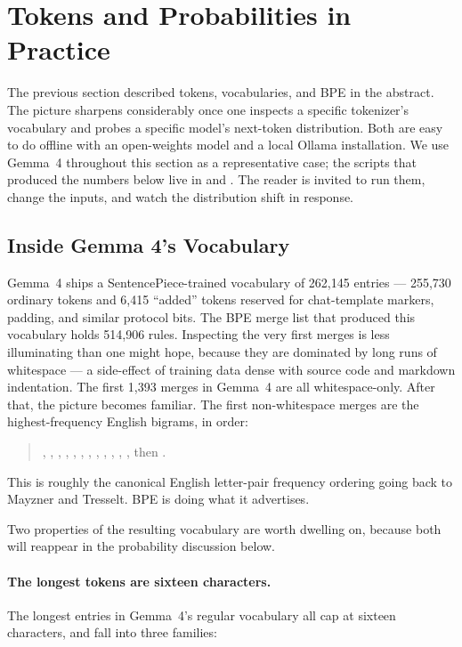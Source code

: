 \section{Tokens and Probabilities in Practice}
\label{sec:mental-tokens-practice}

The previous section described tokens, vocabularies, and BPE in the
abstract. The picture sharpens considerably once one inspects a
specific tokenizer's vocabulary and probes a specific model's
next-token distribution. Both are easy to do offline with an
open-weights model and a local Ollama installation. We use Gemma~4
throughout this section as a representative case; the scripts that
produced the numbers below live in
 and
. The reader is
invited to run them, change the inputs, and watch the distribution
shift in response.

\subsection{Inside Gemma 4's Vocabulary}
\label{sec:mental-tokens-vocab}

Gemma~4 ships a SentencePiece-trained vocabulary of 262{,}145
entries --- 255{,}730 ordinary tokens and 6{,}415 ``added''
tokens reserved for chat-template markers, padding, and similar
protocol bits. The BPE merge list that produced this vocabulary
holds 514{,}906 rules. Inspecting the very first merges is less
illuminating than one might hope, because they are dominated by
long runs of whitespace --- a side-effect of training data dense
with source code and markdown indentation. The first 1{,}393
merges in Gemma~4 are all whitespace-only. After that, the picture
becomes familiar. The first non-whitespace merges are the
highest-frequency English bigrams, in order:
\begin{quote}
  , , , , ,
  , , , , ,
  , , then .
\end{quote}

\noindent
This is roughly the canonical English letter-pair frequency
ordering going back to Mayzner and Tresselt. BPE is doing what
it advertises.

Two properties of the resulting vocabulary are worth dwelling
on, because both will reappear in the probability discussion
below.

\paragraph{The longest tokens are sixteen characters.}
The longest entries in Gemma~4's regular vocabulary all cap at
sixteen characters, and fall into three families:

